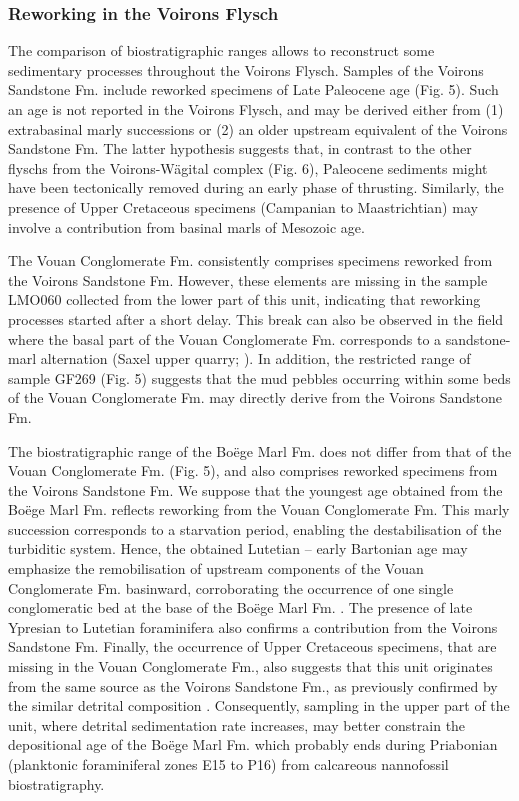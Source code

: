 \documentclass[twoside]{article}
\begin{document}
\subsubsection{Reworking in the Voirons Flysch}

The comparison of biostratigraphic ranges allows to reconstruct some sedimentary processes throughout the Voirons Flysch. Samples of the Voirons Sandstone Fm. include reworked specimens of Late Paleocene age (Fig. 5). Such an age is not reported in the Voirons Flysch, and may be derived either from (1) extrabasinal marly successions or (2) an older upstream equivalent of the Voirons Sandstone Fm. The latter hypothesis suggests that, in contrast to the other flyschs from the Voirons-Wägital complex (Fig. 6), Paleocene sediments might have been tectonically removed during an early phase of thrusting. Similarly, the presence of Upper Cretaceous specimens (Campanian to Maastrichtian) may involve a contribution from basinal marls of Mesozoic age.\par
The Vouan Conglomerate Fm. consistently comprises specimens reworked from the Voirons Sandstone Fm. However, these elements are missing in the sample LMO060 collected from the lower part of this unit, indicating that reworking processes started after a short delay. This break can also be observed in the field where the basal part of the Vouan Conglomerate Fm. corresponds to a sandstone-marl alternation (Saxel upper quarry; \citealp{Ragusa2015}). In addition, the restricted range of sample GF269 (Fig. 5) suggests that the mud pebbles occurring within some beds of the Vouan Conglomerate Fm. may directly derive from the Voirons Sandstone Fm.\par
The biostratigraphic range of the Boëge Marl Fm. does not differ from that of the Vouan Conglomerate Fm. (Fig. 5), and also comprises reworked specimens from the Voirons Sandstone Fm. We suppose that the youngest age obtained from the Boëge Marl Fm. reflects reworking from the Vouan Conglomerate Fm. This marly succession corresponds to a starvation period, enabling the destabilisation of the turbiditic system. Hence, the obtained Lutetian – early Bartonian age may emphasize the remobilisation of upstream components of the Vouan Conglomerate Fm. basinward, corroborating the occurrence of one single conglomeratic bed at the base of the Boëge Marl Fm. \citep{Ragusa2015,Ospina-Ostios2017}. The presence of late Ypresian to Lutetian foraminifera also confirms a contribution from the Voirons Sandstone Fm. Finally, the occurrence of Upper Cretaceous specimens, that are missing in the Vouan Conglomerate Fm., also suggests that this unit originates from the same source as the Voirons Sandstone Fm., as previously confirmed by the similar detrital composition \citep{Ragusa2017a}. Consequently, sampling in the upper part of the unit, where detrital sedimentation rate increases, may better constrain the depositional age of the Boëge Marl Fm. which probably ends during Priabonian (planktonic foraminiferal zones E15 to P16) from calcareous nannofossil biostratigraphy.\par
\end{document}
